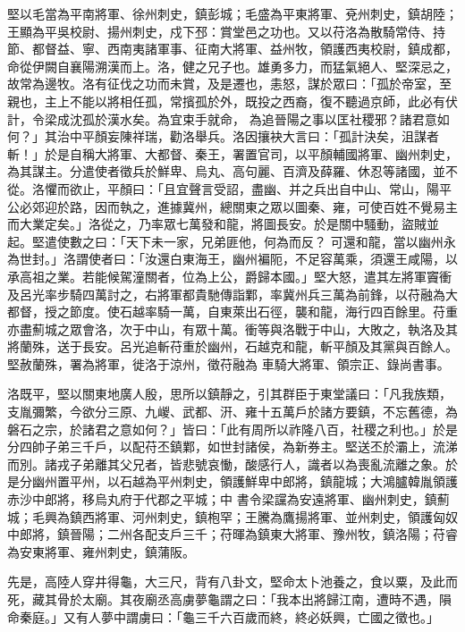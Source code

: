 \begin{pinyinscope}
 堅以毛當為平南將軍、徐州刺史，鎮彭城；毛盛為平東將軍、兗州刺史，鎮胡陸；王顯為平吳校尉、揚州刺史，戍下邳：賞堂邑之功也。又以苻洛為散騎常侍、持節、都督益、寧、西南夷諸軍事、征南大將軍、益州牧，領護西夷校尉，鎮成都，命從伊闕自襄陽溯漢而上。洛，健之兄子也。雄勇多力，而猛氣絕人、堅深忌之，故常為邊牧。洛有征伐之功而未賞，及是遷也，恚怒，謀於眾曰：「孤於帝室，至親也，主上不能以將相任孤，常擯孤於外，既投之西裔，復不聽過京師，此必有伏計，令梁成沈孤於漢水矣。為宜束手就命，
 為追晉陽之事以匡社稷邪？諸君意如何？」其治中平顏妄陳祥瑞，勸洛舉兵。洛因攘袂大言曰：「孤計決矣，沮謀者斬！」於是自稱大將軍、大都督、秦王，署置官司，以平顏輔國將軍、幽州刺史，為其謀主。分遣使者徵兵於鮮卑、烏丸、高句麗、百濟及薛羅、休忍等諸國，並不從。洛懼而欲止，平顏曰：「且宜聲言受詔，盡幽、并之兵出自中山、常山，陽平公必郊迎於路，因而執之，進據冀州，總關東之眾以圖秦、雍，可使百姓不覺易主而大業定矣。」洛從之，乃率眾七萬發和龍，將圖長安。於是關中騷動，盜賊並起。堅遣使數之曰：「天下未一家，兄弟匪他，何為而反？
 可還和龍，當以幽州永為世封。」洛謂使者曰：「汝還白東海王，幽州褊阨，不足容萬乘，須還王咸陽，以承高祖之業。若能候駕潼關者，位為上公，爵歸本國。」堅大怒，遣其左將軍竇衝及呂光率步騎四萬討之，右將軍都貴馳傳詣鄴，率冀州兵三萬為前鋒，以苻融為大都督，授之節度。使石越率騎一萬，自東萊出石徑，襲和龍，海行四百餘里。苻重亦盡薊城之眾會洛，次于中山，有眾十萬。衝等與洛戰于中山，大敗之，執洛及其將蘭殊，送于長安。呂光追斬苻重於幽州，石越克和龍，斬平顏及其黨與百餘人。堅赦蘭殊，署為將軍，徙洛于涼州，徵苻融為
 車騎大將軍、領宗正、錄尚書事。



 洛既平，堅以關東地廣人殷，思所以鎮靜之，引其群臣于東堂議曰：「凡我族類，支胤彌繁，今欲分三原、九嵕、武都、汧、雍十五萬戶於諸方要鎮，不忘舊德，為磐石之宗，於諸君之意如何？」皆曰：「此有周所以祚隆八百，社稷之利也。」於是分四帥子弟三千戶，以配苻丕鎮鄴，如世封諸侯，為新券主。堅送丕於灞上，流涕而別。諸戎子弟離其父兄者，皆悲號哀慟，酸感行人，識者以為喪亂流離之象。於是分幽州置平州，以石越為平州刺史，領護鮮卑中郎將，鎮龍城；大鴻臚韓胤領護赤沙中郎將，移烏丸府于代郡之平城；中
 書令梁讜為安遠將軍、幽州刺史，鎮薊城；毛興為鎮西將軍、河州刺史，鎮枹罕；王騰為鷹揚將軍、並州刺史，領護匈奴中郎將，鎮晉陽；二州各配支戶三千；苻暉為鎮東大將軍、豫州牧，鎮洛陽；苻睿為安東將軍、雍州刺史，鎮蒲阪。



 先是，高陸人穿井得龜，大三尺，背有八卦文，堅命太卜池養之，食以粟，及此而死，藏其骨於太廟。其夜廟丞高虜夢龜謂之曰：「我本出將歸江南，遭時不遇，隕命秦庭。」又有人夢中謂虜曰：「龜三千六百歲而終，終必妖興，亡國之徵也。」




\end{pinyinscope}
